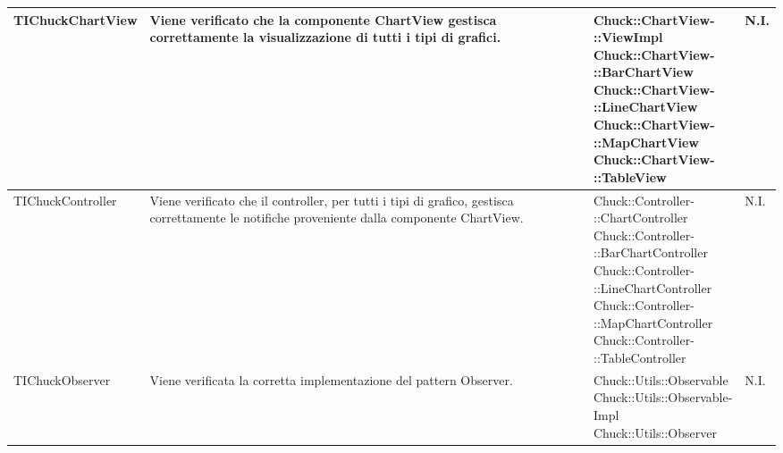 \begin{longtabu}{| X | X | X[0.9] | X[0.3] |}
	TIChuckChartView
				&
Viene verificato che la componente ChartView gestisca correttamente la visualizzazione di tutti i tipi di grafici.
			& \parbox[t]{0.6\textwidth}{
Chuck::ChartView-\\::ViewImpl\\
Chuck::ChartView-\\::BarChartView\\
Chuck::ChartView-\\::LineChartView\\
Chuck::ChartView-\\::MapChartView\\
Chuck::ChartView-\\::TableView}
			& N.I.
			\\ \hline



	TIChuckController
				&
Viene verificato che il controller, per tutti i tipi di grafico, gestisca correttamente le notifiche proveniente dalla componente ChartView.
			& \parbox[t]{0.6\textwidth}{
Chuck::Controller-\\::ChartController\\
Chuck::Controller-\\::BarChartController\\
Chuck::Controller-\\::LineChartController\\
Chuck::Controller-\\::MapChartController\\
Chuck::Controller-\\::TableController}
			& N.I.
			\\ \hline



	TIChuckObserver &
Viene verificata la corretta implementazione del pattern Observer.
			& \parbox[t]{0.6\textwidth}{
Chuck::Utils::Observable\\
Chuck::Utils::Observable-\\Impl\\
Chuck::Utils::Observer}
			& N.I.
			\\ \hline











\end{longtabu}
